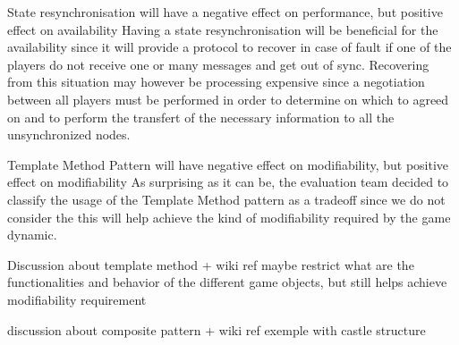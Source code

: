 
\begin{description}[style=nextline]
  \item[T1\label{t1}] State resynchronisation will have a negative effect on performance, but positive effect on availability
    \vspace{\baselineskip}
    \newline
    Having a state resynchronisation will be beneficial for the availability since it will provide a protocol to recover in case of fault if one of the players do not receive one or many messages and get out of sync. Recovering from this situation may however be processing expensive since a negotiation between all players must be performed in order to determine on which to agreed on and to perform the transfert of the necessary information to all the unsynchronized nodes.

  \item[T2\label{t2}] Template Method Pattern will have negative effect on modifiability, but positive effect on modifiability
    \vspace{\baselineskip}
    \newline
    As surprising as it can be, the evaluation team decided to classify the usage of the Template Method pattern as a tradeoff since we do not consider the this will help achieve the kind of modifiability required by the game dynamic.

    Discussion about template method + wiki ref
    maybe restrict what are the functionalities and behavior of the different game objects, but still helps achieve modifiability requirement

    discussion about composite pattern + wiki ref exemple with castle structure
\end{description}
